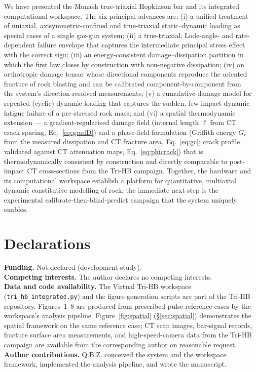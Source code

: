 \documentclass[11pt]{article}
\begin{document}
We have presented the Monash true-triaxial Hopkinson bar and its integrated
computational workspace. The six principal advances are: (i) a unified treatment of
uniaxial, axisymmetric-confined and true-triaxial static--dynamic loading as
special cases of a single gas-gun system; (ii) a true-triaxial, Lode-angle- and rate-dependent failure
envelope that captures the intermediate principal stress effect with the correct
sign; (iii) an energy-consistent damage--dissipation partition in which the first
law closes by construction with non-negative dissipation; (iv) an orthotropic damage tensor whose
directional components reproduce the oriented fracture of rock blasting and can be
calibrated component-by-component from the system's direction-resolved
measurements; (v) a cumulative-damage model for repeated (cyclic) dynamic
loading that captures the sudden, few-impact dynamic-fatigue failure of a
pre-stressed rock mass; and (vi) a spatial thermodynamic extension --- a
gradient-regularised damage field (internal length $\ell$ from CT crack spacing,
Eq.~\eqref{eq:gradD}) and a phase-field formulation (Griffith energy $G_c$ from
the measured dissipation and CT fracture area, Eq.~\eqref{eq:gc}; crack profile
validated against CT attenuation maps, Eq.~\eqref{eq:phicrack}) that is
thermodynamically consistent by construction and directly comparable to
post-impact CT cross-sections from the Tri-HB campaign.  Together, the hardware
and its computational workspace establish a platform for quantitative, multiaxial
dynamic constitutive modelling of rock; the immediate next step is the experimental
calibrate-then-blind-predict campaign that the system uniquely enables.

\section*{Declarations}

\noindent\textbf{Funding.} Not declared (development study).\\[2pt]
\textbf{Competing interests.} The author declares no competing interests.\\[2pt]
\textbf{Data and code availability.} The Virtual Tri-HB workspace
(\texttt{tri\_hb\_integrated.py}) and the figure-generation scripts are part of the
Tri-HB repository. Figures~1--8 are produced from prescribed-pulse reference cases
by the workspace's analysis pipeline. Figure~\ref{fig:spatial} (§\ref{sec:spatial})
demonstrates the spatial framework on the same reference case; CT scan images,
bar-signal records, fracture surface area measurements, and high-speed-camera data
from the Tri-HB campaign are available from the corresponding author on reasonable
request.\\[2pt]
\textbf{Author contributions.} Q.B.Z. conceived the system and the workspace
framework, implemented the analysis pipeline, and wrote the manuscript.

\printbibliography
\end{document}
